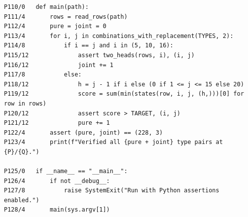\documentclass[11pt,letterpaper]{article}
\theoremstyle{cleanthm}
\begin{document}
\begin{Verbatim}[fontsize=\fontsize{8.3pt}{9.6pt}\selectfont]
P110/0   def main(path):
P111/4       rows = read_rows(path)
P112/4       pure = joint = 0
P113/4       for i, j in combinations_with_replacement(TYPES, 2):
P114/8           if i == j and i in (5, 10, 16):
P115/12              assert two_heads(rows, i), (i, j)
P116/12              joint += 1
P117/8           else:
P118/12              h = j - 1 if i else (0 if 1 <= j <= 15 else 20)
P119/12              score = sum(min(states(row, i, j, (h,)))[0] for row in rows)
P120/12              assert score > TARGET, (i, j)
P121/12              pure += 1
P122/4       assert (pure, joint) == (228, 3)
P123/4       print(f"Verified all {pure + joint} type pairs at {P}/{Q}.")

P125/0   if __name__ == "__main__":
P126/4       if not __debug__:
P127/8           raise SystemExit("Run with Python assertions enabled.")
P128/4       main(sys.argv[1])
\end{Verbatim}
\label{app:checker-end}
\clearpage
{}
\end{document}
